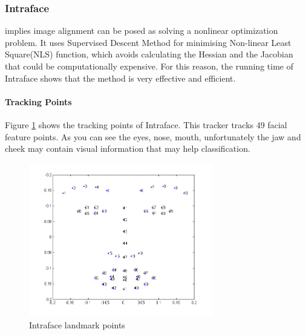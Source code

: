 \subsubsection{Intraface}
\cite{xiong2013supervised} implies image alignment  can be posed as solving a nonlinear optimization problem. It uses Supervised Descent Method for minimising Non-linear Least Square(NLS) function, which avoids calculating the Hessian and the Jacobian that could be computationally expensive. For this reason, the running time of Intraface shows that the method is very effective and efficient.
\paragraph{Tracking Points}
Figure \ref{fig:IPI} shows the tracking points of Intraface. This tracker tracks 49 facial feature points. As you can see the eyes, nose, mouth, unfortunately the jaw and cheek may contain visual information that may help classification.
\begin{figure}[ht]
\centering
\includegraphics[width = 80mm]{imgs/FacialIndexIntraface.png}
\caption{Intraface landmark points}
\label{fig:IPI}
\end{figure}

